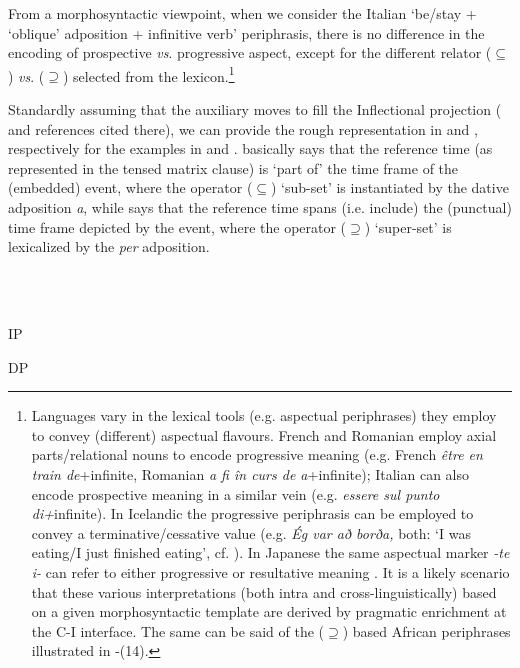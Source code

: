\documentclass[output=paper,colorlinks,citecolor=brown]{./langscibook}
\begin{document}
From a morphosyntactic viewpoint, when we consider the Italian ‘be/stay + ‘oblique’ adposition + infinitive verb’ periphrasis, there is no difference in the encoding of prospective \textit{vs}. progressive aspect, except for the different relator  (${\subseteq}$) \textit{vs}. (${\supseteq}$) selected from the lexicon.\footnote{Languages vary in the lexical tools (e.g. aspectual periphrases) they employ to convey (different) aspectual flavours. French and Romanian employ axial parts/relational nouns \citep{Svenonius2006} to encode progressive meaning (e.g. French \textit{être en train de}+infinite, Romanian \textit{a fi în curs de a}+infinite); Italian can also encode prospective meaning in a similar vein (e.g. \textit{essere sul punto di+}infinite).  In Icelandic the progressive periphrasis can be employed to convey a terminative/cessative value (e.g. \textit{Ég var að borða,} both: ‘I was eating/I just finished eating’, cf. \citealt{Jóhannsdóttir2012}). In Japanese the same aspectual marker \textit{{}-te i-} can refer to either progressive or resultative meaning \citep{Shirai1998}. It is a likely scenario that these various interpretations (both intra and cross-linguistically) based on a given morphosyntactic template are derived by pragmatic enrichment at the C-I interface. The same can be said of the (\textrm{${\supseteq}$}) based African periphrases illustrated in -(14).} 

Standardly assuming that the auxiliary moves to fill the Inflectional projection (\citealt{ManziniLorussoSavoia2017} and references cited there), we can provide the rough representation in  and , respectively for the examples in  and .  basically says that the reference time (as represented in the tensed matrix clause) is ‘part of’ the time frame of the (embedded) event, where the operator (${\subseteq}$) ‘sub-set’  is instantiated by the dative adposition \textit{a}, while  says that the reference time spans (i.e. include) the (punctual) time frame depicted by the event, where the operator (${\supseteq}$) ‘super-set’ is lexicalized by the \textit{per} adposition.

\ea%
    \label{ex:key:25}
    \gll\\
        \\
    \glt
    \z

                                    IP

                  DP 
\end{document}
